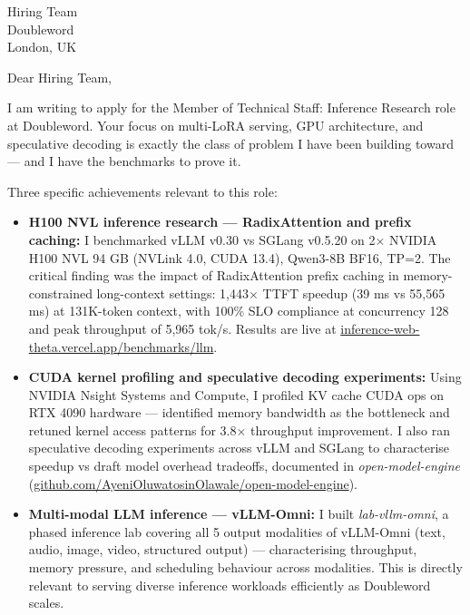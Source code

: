 \documentclass[12pt,a4paper]{letter}
\date{\today}
\begin{document}
\begin{letter}{Hiring Team \\ Doubleword \\ London, UK}

\opening{Dear Hiring Team,}

I am writing to apply for the Member of Technical Staff: Inference Research role at Doubleword. Your focus on multi-LoRA serving, GPU architecture, and speculative decoding is exactly the class of problem I have been building toward — and I have the benchmarks to prove it.

Three specific achievements relevant to this role:

\begin{itemize}
  \item \textbf{H100 NVL inference research — RadixAttention and prefix caching:} I benchmarked vLLM v0.30 vs SGLang v0.5.20 on 2$\times$ NVIDIA H100 NVL 94 GB (NVLink 4.0, CUDA 13.4), Qwen3-8B BF16, TP=2. The critical finding was the impact of RadixAttention prefix caching in memory-constrained long-context settings: 1,443$\times$ TTFT speedup (39 ms vs 55,565 ms) at 131K-token context, with 100\% SLO compliance at concurrency 128 and peak throughput of 5,965 tok/s. Results are live at \href{https://inference-web-theta.vercel.app/benchmarks/llm}{inference-web-theta.vercel.app/benchmarks/llm}.

  \item \textbf{CUDA kernel profiling and speculative decoding experiments:} Using NVIDIA Nsight Systems and Compute, I profiled KV cache CUDA ops on RTX 4090 hardware — identified memory bandwidth as the bottleneck and retuned kernel access patterns for 3.8$\times$ throughput improvement. I also ran speculative decoding experiments across vLLM and SGLang to characterise speedup vs draft model overhead tradeoffs, documented in \textit{open-model-engine} (\href{https://github.com/AyeniOluwatosinOlawale/open-model-engine}{github.com/AyeniOluwatosinOlawale/open-model-engine}).

  \item \textbf{Multi-modal LLM inference — vLLM-Omni:} I built \textit{lab-vllm-omni}, a phased inference lab covering all 5 output modalities of vLLM-Omni (text, audio, image, video, structured output) — characterising throughput, memory pressure, and scheduling behaviour across modalities. This is directly relevant to serving diverse inference workloads efficiently as Doubleword scales.
\end{itemize}


\end{letter}
\end{document}
